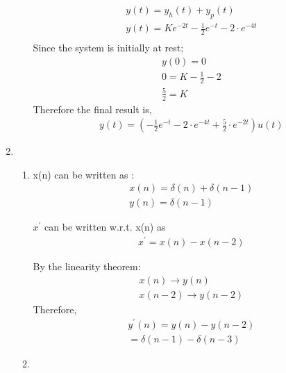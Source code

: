 \documentclass[10pt,a4paper, margin=1in]{article}
\begin{document}
\begin{enumerate}
\begin{enumerate}
    \begin{align}
        y(t) = y_{h}(t) + y_{p}(t) \\
        y(t) = Ke^{-2t} - \frac{1}{2} e^{-t} - 2 \cdot e^{-4t} \\
    \end{align}
    Since the system is initially at rest;
    \begin{align}
        y(0) = 0 \\
        0 = K - \frac{1}{2} - 2 \\
        \frac{5}{2} =  K
    \end{align}
    Therefore the final result is,
    \begin{align}
        y(t) = (-\frac{1}{2} e^{-t} - 2\cdot e^{-4t} + \frac{5}{2} \cdot e^{-2t})u(t)
    \end{align}
    
    \end{enumerate}

\item %
    \begin{enumerate}
    \item %
    x(n) can be written as :
    \begin{align*}
        x(n) = \delta(n) + \delta(n-1) \\
        y(n) = \delta(n-1)
    \end{align*}
    
    $x^{\prime} $ can be written w.r.t. x(n) as
    \begin{align*}
        x^{\prime} = x(n) - x(n-2)
    \end{align*}
    
    By the linearity theorem:
    \begin{align*}
        x(n) \longrightarrow y(n) \\
        x(n-2) \longrightarrow y(n-2) 
    \end{align*}
    Therefore,
    \begin{align*}
        y^{\prime}(n) = y(n) - y(n-2) \\
        = \delta(n-1) - \delta(n-3)
    \end{align*}
    
    \item %
    
    
    

\end{enumerate}
\end{enumerate}
\end{document}
